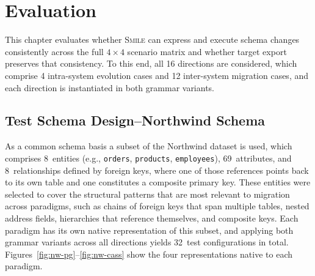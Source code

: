   \chapter{Evaluation}\label{ch:evaluation}


  This chapter evaluates whether \textsc{Smile} can express and execute
  schema changes consistently across the full $4 \times 4$ scenario
  matrix and whether target export preserves that consistency. To
  this end, all 16 directions are considered, which comprise 4
  intra-system evolution cases and 12 inter-system migration cases,
  and each direction is instantiated in both grammar variants.

  \section{Test Schema Design--Northwind Schema}\label{sec:test-schema}


As a common schema basis a subset of the Northwind dataset is used,
  which comprises 8~entities (e.g., \texttt{orders}, \texttt{products},
  \texttt{employees}), 69~attributes, and 8~relationships defined by
  foreign keys, where one of those references points back to its own
  table and one constitutes a composite primary key. These entities
  were selected to cover the structural patterns that are most
  relevant to migration across paradigms, such as chains of foreign
  keys that span multiple tables, nested address fields, hierarchies
  that reference themselves, and composite keys. Each paradigm has
  its own native representation of this subset, and applying both
  grammar variants across all directions yields 32~test configurations
  in total. Figures~\ref{fig:nw-pg}--\ref{fig:nw-cass} show the four
  representations native to each paradigm.

